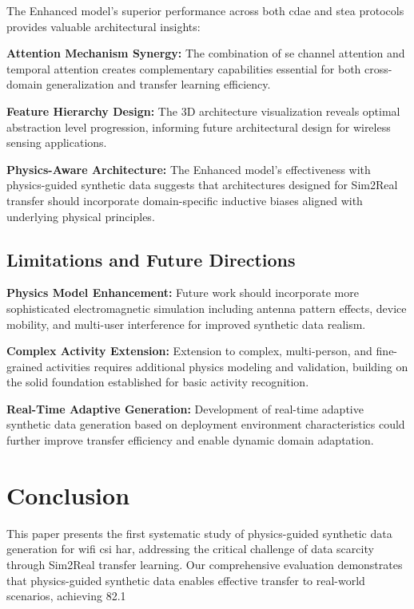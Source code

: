 \documentclass[journal]{IEEEtran}
\begin{document}
{The Enhanced model's superior performance across both \gls{cdae} and \gls{stea} protocols provides valuable architectural insights:

\textbf{Attention Mechanism Synergy:} The combination of \gls{se} channel attention and temporal attention creates complementary capabilities essential for both cross-domain generalization and transfer learning efficiency.

\textbf{Feature Hierarchy Design:} The 3D architecture visualization reveals optimal abstraction level progression, informing future architectural design for wireless sensing applications.

\textbf{Physics-Aware Architecture:} The Enhanced model's effectiveness with physics-guided synthetic data suggests that architectures designed for Sim2Real transfer should incorporate domain-specific inductive biases aligned with underlying physical principles.

\subsection{Limitations and Future Directions}

\textbf{Physics Model Enhancement:} Future work should incorporate more sophisticated electromagnetic simulation including antenna pattern effects, device mobility, and multi-user interference for improved synthetic data realism.

\textbf{Complex Activity Extension:} Extension to complex, multi-person, and fine-grained activities requires additional physics modeling and validation, building on the solid foundation established for basic activity recognition.

\textbf{Real-Time Adaptive Generation:} Development of real-time adaptive synthetic data generation based on deployment environment characteristics could further improve transfer efficiency and enable dynamic domain adaptation.

\section{Conclusion}

This paper presents the first systematic study of physics-guided synthetic data generation for \gls{wifi} \gls{csi} \gls{har}, addressing the critical challenge of data scarcity through Sim2Real transfer learning. Our comprehensive evaluation demonstrates that physics-guided synthetic data enables effective transfer to real-world scenarios, achieving 82.1%

}
\end{document}
